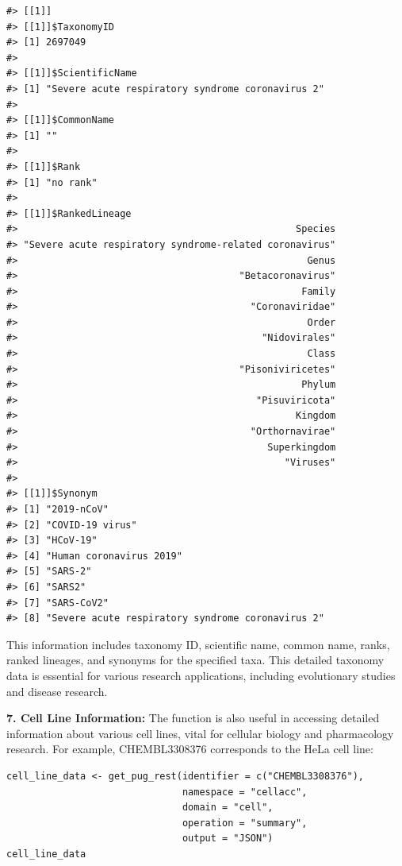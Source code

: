 \begin{verbatim}
#> [[1]]
#> [[1]]$TaxonomyID
#> [1] 2697049
#> 
#> [[1]]$ScientificName
#> [1] "Severe acute respiratory syndrome coronavirus 2"
#> 
#> [[1]]$CommonName
#> [1] ""
#> 
#> [[1]]$Rank
#> [1] "no rank"
#> 
#> [[1]]$RankedLineage
#>                                                 Species 
#> "Severe acute respiratory syndrome-related coronavirus" 
#>                                                   Genus 
#>                                       "Betacoronavirus" 
#>                                                  Family 
#>                                         "Coronaviridae" 
#>                                                   Order 
#>                                           "Nidovirales" 
#>                                                   Class 
#>                                       "Pisoniviricetes" 
#>                                                  Phylum 
#>                                          "Pisuviricota" 
#>                                                 Kingdom 
#>                                         "Orthornavirae" 
#>                                            Superkingdom 
#>                                               "Viruses" 
#> 
#> [[1]]$Synonym
#> [1] "2019-nCoV"                                      
#> [2] "COVID-19 virus"                                 
#> [3] "HCoV-19"                                        
#> [4] "Human coronavirus 2019"                         
#> [5] "SARS-2"                                         
#> [6] "SARS2"                                          
#> [7] "SARS-CoV2"                                      
#> [8] "Severe acute respiratory syndrome coronavirus 2"
\end{verbatim}

This information includes taxonomy ID, scientific name, common name, ranks, ranked lineages, and synonyms for the specified taxa. This detailed taxonomy data is essential for various research applications, including evolutionary studies and disease research.

\textbf{7. Cell Line Information:} The function is also useful in accessing detailed information about various cell lines, vital for cellular biology and pharmacology research. For example, CHEMBL3308376 corresponds to the HeLa cell line:

\begin{verbatim}
cell_line_data <- get_pug_rest(identifier = c("CHEMBL3308376"), 
                               namespace = "cellacc", 
                               domain = "cell", 
                               operation = "summary", 
                               output = "JSON")
cell_line_data
\end{verbatim}


